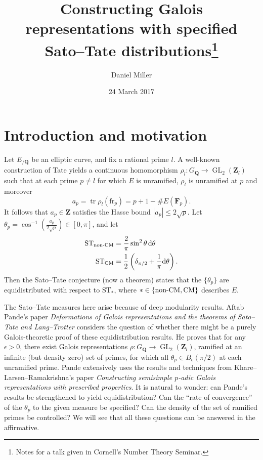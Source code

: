 \documentclass{article}
\title{Constructing Galois representations with specified Sato--Tate 
distributions\thanks{Notes for a talk given in Cornell's Number Theory 
Seminar.}}
\author{Daniel Miller}
\date{24 March 2017}
\DeclareMathOperator{\GL}{GL}
\DeclareMathOperator{\tr}{tr}
\newcommand{\bF}{\mathbf{F}}
\newcommand{\bQ}{\mathbf{Q}}
\newcommand{\bZ}{\mathbf{Z}}
\newcommand{\CM}{\mathrm{CM}}
\newcommand{\dd}{\mathrm{d}}
\newcommand{\frob}{\mathrm{fr}}
\newcommand{\nonCM}{\textnormal{non-CM}}
\newcommand{\ST}{\mathrm{ST}}
\begin{document}
\maketitle





\section{Introduction and motivation}

Let $E_{/\bQ}$ be an elliptic curve, and fix a rational prime $l$. A well-known 
construction of Tate yields a continuous homomorphism 
$\rho_l\colon G_\bQ \to \GL_2(\bZ_l)$ such that at each prime $p\ne l$ for 
which $E$ is unramified, $\rho_l$ is unramified at $p$ and moreover 
\[
	a_p = \tr\rho_l (\frob_p) = p + 1 - \# E(\bF_p) .
\]
It follows that $a_p\in \bZ$ satisfies the Hasse bound 
$|a_p| \leqslant 2\sqrt p$. Let 
$\theta_p = \cos^{-1}\left( \frac{a_p}{2\sqrt p}\right) \in [0,\pi]$, and let 
\begin{align*}
	\ST_\nonCM &= \frac{2}{\pi} \sin^2\theta\, \dd\theta \\
	\ST_\CM &= \frac 1 2 \left( \delta_{\pi/2} + \frac 1 \pi \dd \theta\right) .
\end{align*}
Then the Sato--Tate conjecture (now a theorem) states that the $\{\theta_p\}$ 
are equidistributed with respect to $\ST_\ast$, where $\ast\in \{\nonCM,\CM\}$ 
describes $E$. 

The Sato--Tate measures here arise because of deep modularity results. Aftab 
Pande's paper \emph{Deformations of Galois representations and the theorems of 
Sato--Tate and Lang--Trotter} considers the question of whether there might be 
a purely Galois-theoretic proof of these equidistribution results. He proves 
that for any $\epsilon>0$, there exist Galois representations 
$\rho\colon G_\bQ \to \GL_2(\bZ_l)$, ramified at an infinite (but density zero) 
set of primes, for which all $\theta_p\in B_\epsilon(\pi/2)$ at each unramified 
prime. Pande extensively uses the results and techniques from 
Khare--Larsen--Ramakrishna's paper \emph{Constructing semisimple $p$-adic 
Galois representations with prescribed properties}. It is natural to wonder: 
can Pande's results be strengthened to yield equidistribution? Can the ``rate 
of convergence'' of the $\theta_p$ to the given measure be specified? Can the 
density of the set of ramified primes be controlled? We will see that all these 
questions can be answered in the affirmative. 
\end{document}
